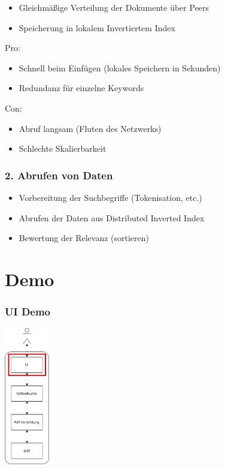 \documentclass{beamer}
\begin{document}
\begin{frame}[allowframebreaks]
  \begin{itemize}
    \item Gleichmäßige Verteilung der Dokumente über Peers
    \item Speicherung in lokalem Invertiertem Index
  \end{itemize}

  \bigskip

  Pro:
  \begin{itemize}
    \item Schnell beim Einfügen (lokales Speichern in Sekunden)
    \item Redundanz für einzelne Keywords
  \end{itemize}
  Con:
  \begin{itemize}
    \item Abruf langsam (Fluten des Netzwerks)
    \item Schlechte Skalierbarkeit
  \end{itemize}
\end{frame}

\begin{frame}
  \frametitle{2. Abrufen von Daten}

  \begin{itemize}
    \item Vorbereitung der Suchbegriffe (Tokenisation, etc.)
    \item Abrufen der Daten aus Distributed Inverted Index
    \item Bewertung der Relevanz (sortieren)
  \end{itemize}
\end{frame}

\section{Demo}
\begin{frame}
  \frametitle{UI Demo}

  \begin{center}
    \includegraphics[height=6cm]{Schichten-alt-ui}
  \end{center}
\end{frame}
\end{document}
